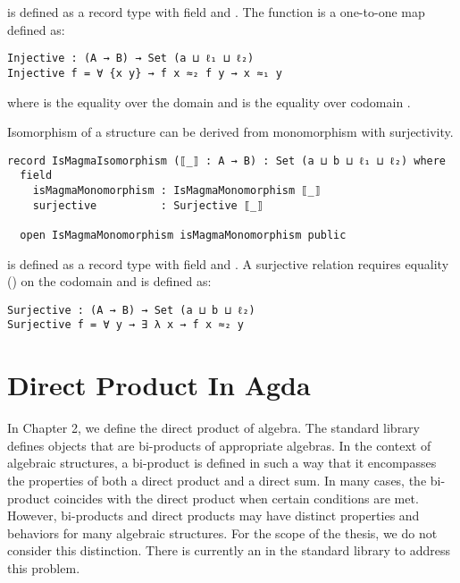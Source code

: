  is defined as a record type with field
 and . The 
function is a one-to-one map defined as:

\begin{verbatim}
Injective : (A → B) → Set (a ⊔ ℓ₁ ⊔ ℓ₂)
Injective f = ∀ {x y} → f x ≈₂ f y → x ≈₁ y
\end{verbatim}

where  is the equality over the domain  and 
is the equality over codomain .

Isomorphism of a structure can be derived from monomorphism with surjectivity.

\begin{verbatim}
record IsMagmaIsomorphism (⟦_⟧ : A → B) : Set (a ⊔ b ⊔ ℓ₁ ⊔ ℓ₂) where
  field
    isMagmaMonomorphism : IsMagmaMonomorphism ⟦_⟧
    surjective          : Surjective ⟦_⟧

  open IsMagmaMonomorphism isMagmaMonomorphism public
\end{verbatim} 

 is defined as a record type with field
 and . A surjective relation
requires equality () on the codomain  and is defined as:

\begin{verbatim}
Surjective : (A → B) → Set (a ⊔ b ⊔ ℓ₂)
Surjective f = ∀ y → ∃ λ x → f x ≈₂ y
\end{verbatim}

\section{Direct Product In Agda}
In Chapter 2, we define the direct product of algebra. The standard library defines
objects that are bi-products of appropriate algebras. In the context of algebraic
structures, a bi-product is defined in such a way that it encompasses the
properties of both a direct product and a direct sum. In many cases, the
bi-product coincides with the direct product when certain conditions are met.
However, bi-products and direct products may have distinct properties and
behaviors for many algebraic structures. For the scope of the thesis, we do not
consider this distinction. There is currently an
 in the standard
library to address this problem. 

